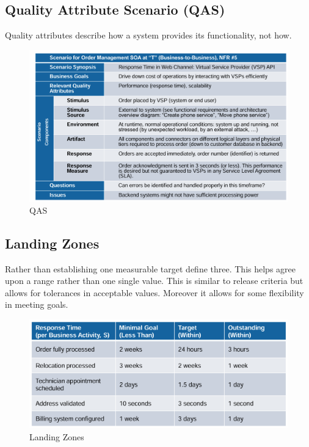 \documentclass[../Main.tex]{subfiles}
\begin{document}
\subsection{Quality Attribute Scenario (QAS)}
Quality attributes describe how a system provides its functionality, not how.

\begin{figure}[H] 
    \centering
    \includegraphics[width=1\linewidth]{Images/qas.png}
    \caption{QAS}
    \label{fig:qas}
\end{figure}

\newpage
\subsection{Landing Zones}
Rather than establishing one measurable target define three.
This helps agree upon a range rather than one single value.
This is similar to release criteria but allows for tolerances
in acceptable values. Moreover it allows for some flexibility
in meeting goals.

\begin{figure}[H]
    \centering
    \includegraphics[width=1\linewidth]{Images/landingzone.png}
    \caption{Landing Zones}
\end{figure}
\newpage
\end{document}
